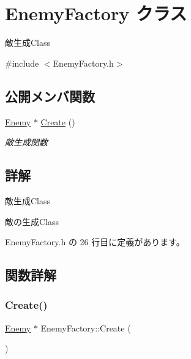 \hypertarget{class_enemy_factory}{}\section{Enemy\+Factory クラス}
\label{class_enemy_factory}


敵生成\+Class  




{\ttfamily \#include $<$Enemy\+Factory.\+h$>$}

\subsection*{公開メンバ関数}
\begin{DoxyCompactItemize}
\item 
\mbox{\hyperlink{class_enemy}{Enemy}} $\ast$ \mbox{\hyperlink{class_enemy_factory_ab0d5c26c51993cc9ee060fff2cafa9cd}{Create}} ()
\begin{DoxyCompactList}\small\item\em 敵生成関数 \end{DoxyCompactList}\end{DoxyCompactItemize}


\subsection{詳解}
敵生成\+Class 

敵の生成\+Class 

 Enemy\+Factory.\+h の 26 行目に定義があります。



\subsection{関数詳解}
\mbox{\label{class_enemy_factory_ab0d5c26c51993cc9ee060fff2cafa9cd}} 
\subsubsection{\texorpdfstring{Create()}{Create()}}
{\footnotesize\ttfamily \mbox{\hyperlink{class_enemy}{Enemy}} $\ast$ Enemy\+Factory\+::\+Create (\begin{DoxyParamCaption}{ }\end{DoxyParamCaption})}



